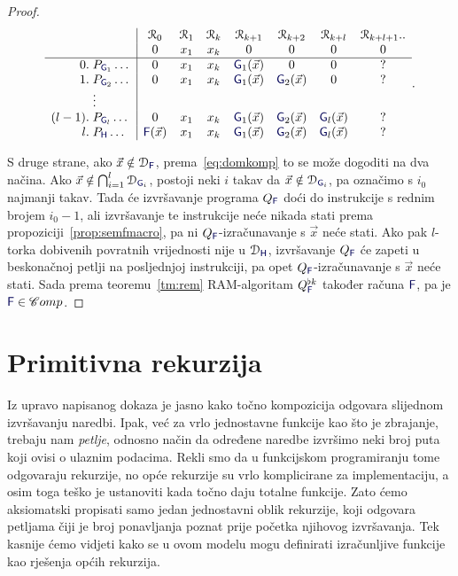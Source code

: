 \begin{proof}
\begin{equation}
\begin{array}{r@{\;}l|ccccccc}
      &               &\reg0       &\reg1&\reg{k}&\reg{k+1}     &\reg{k+2}     &\reg{k+l}     &\reg{k+l+1}..\\
      &               & 0          &x_1  &x_k    &0             &0             &0             &0            \\\hline
0.    &P_{\f G_1}\dots& 0          &x_1  &x_k    &\f G_1(\vec x)&0             &0             &?            \\
1.    &P_{\f G_2}\dots& 0          &x_1  &x_k    &\f G_1(\vec x)&\f G_2(\vec x)&0             &?            \\
      &\vdots                                                                                               \\
(l-1).&P_{\f G_l}\dots& 0          &x_1  &x_k    &\f G_1(\vec x)&\f G_2(\vec x)&\f G_l(\vec x)&?            \\
l.    &P_{\f H}\dots  &\f F(\vec x)&x_1  &x_k    &\f G_1(\vec x)&\f G_2(\vec x)&\f G_l(\vec x)&?
    \end{array}\text.
\end{equation}

S druge strane, ako $\vec x\notin\dom{\f F}$, prema~\eqref{eq:domkomp} to se može dogoditi na dva načina. Ako $\vec x\notin\bigcap_{i=1}^l\dom{\f G_i}$, postoji neki $i$ takav da $\vec x\notin\dom{\f G_i}$, pa označimo s $i_0$ najmanji takav. Tada će izvršavanje programa $Q_{\f F}$ doći do instrukcije s rednim brojem $i_0-1$, ali izvršavanje te instrukcije neće nikada stati prema propoziciji~\ref{prop:semfmacro}, pa ni $Q_{\f F}$-izračunavanje s $\vec x$ neće stati. Ako pak $l$-torka dobivenih povratnih vrijednosti nije u $\dom{\f H}$, izvršavanje $Q_{\f F}$ će zapeti u beskonačnoj petlji na posljednjoj instrukciji, pa opet $Q_{\f F}$-izračunavanje s $\vec x$ neće stati.
Sada prema teoremu~\ref{tm:rem} RAM-algoritam $Q_{\f F}^{\flat k}$ također računa $\f F$, pa je $\f F\in\mathscr Comp$.
\end{proof}

\section{Primitivna rekurzija}

Iz upravo napisanog dokaza je jasno kako točno kompozicija odgovara slijednom iz\-vrša\-va\-nju naredbi. Ipak, već za vrlo jednostavne funkcije kao što je zbrajanje, trebaju nam \emph{petlje}, odnosno način da određene naredbe izvršimo neki broj puta koji ovisi o ulaznim podacima. Rekli smo da u funkcijskom programiranju tome odgovaraju rekurzije, no opće rekurzije su vrlo komplicirane za implementaciju, a osim toga teško je ustanoviti kada točno daju totalne funkcije. Zato ćemo aksiomatski propisati samo jedan jednostavni oblik rekurzije, koji odgovara petljama čiji je broj ponavljanja poznat prije početka njihovog izvršavanja. Tek kasnije ćemo vidjeti kako se u ovom modelu mogu definirati izračunljive funkcije kao rješenja općih rekurzija.

